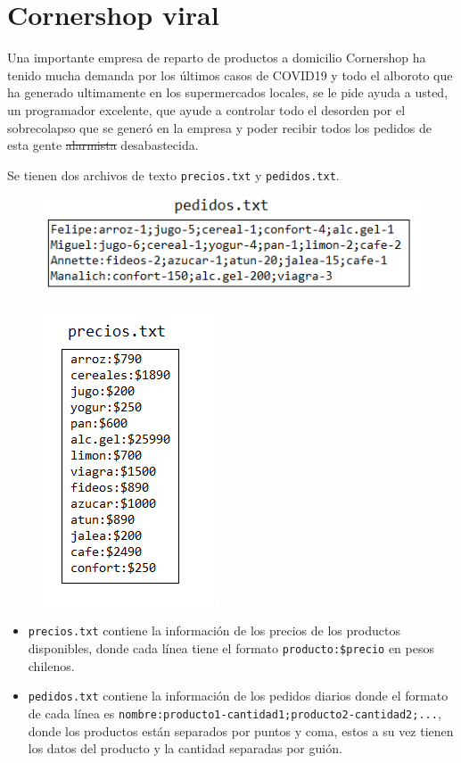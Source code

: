 \section{Cornershop viral}

Una importante empresa de reparto de productos a domicilio Cornershop ha tenido mucha demanda por los últimos casos de COVID19 y todo el alboroto que ha generado ultimamente en los supermercados locales, se le pide ayuda a usted, un programador excelente, que ayude a controlar todo el desorden por el sobrecolapso que se generó en la empresa y poder recibir todos los pedidos de esta gente \sout{alarmista} desabastecida.

Se tienen dos archivos de texto \texttt{precios.txt} y \texttt{pedidos.txt}. 

\begin{figure}[H]
    \centering
    \includegraphics{Imagenes/pedidos.png}
\end{figure}
\begin{figure}[H]
    \centering
    \includegraphics{Imagenes/precios.png}
\end{figure}

\begin{itemize}
    \item \texttt{precios.txt} contiene la información de los precios de los productos disponibles, donde cada línea tiene el formato \texttt{producto:\$precio} en pesos chilenos. 
    \item \texttt{pedidos.txt} contiene la información de los pedidos diarios donde el formato de cada línea es \texttt{nombre:producto1-cantidad1;producto2-cantidad2;...}, donde los productos están separados por puntos y coma, estos a su vez tienen los datos del producto y la cantidad separadas por guión.
\end{itemize}

